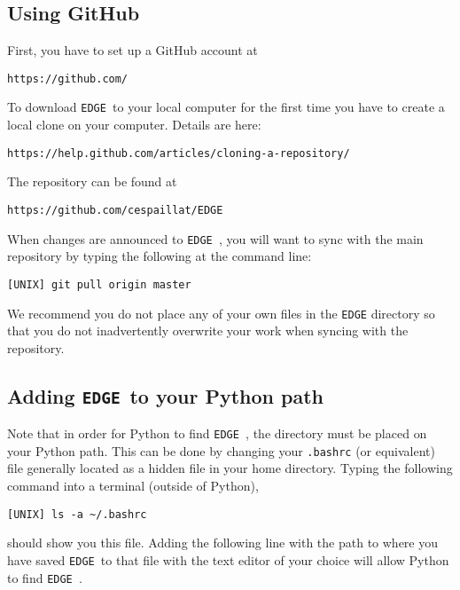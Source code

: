 \documentclass{article}
\newcommand{\edge}{\texttt{EDGE }}
\begin{document}
\subsection{Using GitHub} \label{github}

First, you have to set up a GitHub account at 

\vspace{2mm}
\texttt{https://github.com/}
\vspace{2mm}

\noindent To download \edge to your local computer for the first time you have to create a local clone on your computer.  Details are here: 

\vspace{2mm}
\texttt{https://help.github.com/articles/cloning-a-repository/}
\vspace{2mm}

\noindent The repository can be found at

\vspace{2mm}
\texttt{https://github.com/cespaillat/EDGE}
\vspace{2mm}

\noindent When changes are announced to \edge, you will want to sync with the main repository by typing the following at the command line:

\vspace{2mm}
\texttt{[UNIX] git pull origin master}
\vspace{2mm}

\noindent We recommend you do not place any of your own files in the \texttt{EDGE} directory so that you do not inadvertently overwrite your work when syncing with the repository.

\subsection{Adding \edge to your Python path} \label{addingedgetopath}

Note that in order for Python to find \edge, the directory must be placed on your Python path. This can be done by changing your \texttt{.bashrc} (or equivalent) file generally located as a hidden file in your home directory. Typing the following command into a terminal (outside of Python),

\vspace{2mm}
\texttt{[UNIX] ls -a \textasciitilde/.bashrc}
\vspace{2mm}

should show you this file. Adding the following line with the path to where you have saved \edge to that file with the text editor of your choice will allow Python to find \edge.
\end{document}
